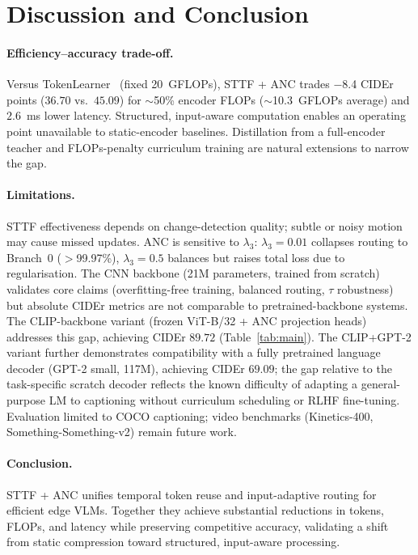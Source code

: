 \documentclass{article}
\begin{document}
\section{Discussion and Conclusion}

\paragraph{Efficiency--accuracy trade-off.}
Versus TokenLearner~\cite{ryoo2021tokenlearner} (fixed 20~GFLOPs), STTF + ANC trades $-$8.4 CIDEr points ($36.70$ vs.\ $45.09$) for $\sim$50\% encoder FLOPs ($\sim$10.3~GFLOPs average) and $2.6$~ms lower latency. Structured, input-aware computation enables an operating point unavailable to static-encoder baselines. Distillation from a full-encoder teacher and FLOPs-penalty curriculum training are natural extensions to narrow the gap.

\paragraph{Limitations.}
STTF effectiveness depends on change-detection quality; subtle or noisy motion may cause missed updates. ANC is sensitive to $\lambda_3$: $\lambda_3{=}0.01$ collapses routing to Branch~0 ($>$99.97\%), $\lambda_3{=}0.5$ balances but raises total loss due to regularisation. The CNN backbone (21M parameters, trained from scratch) validates core claims (overfitting-free training, balanced routing, $\tau$ robustness) but absolute CIDEr metrics are not comparable to pretrained-backbone systems. The CLIP-backbone variant (frozen ViT-B/32 + ANC projection heads) addresses this gap, achieving CIDEr $89.72$ (Table~\ref{tab:main}). The CLIP+GPT-2 variant further demonstrates compatibility with a fully pretrained language decoder (GPT-2 small, 117M), achieving CIDEr $69.09$; the gap relative to the task-specific scratch decoder reflects the known difficulty of adapting a general-purpose LM to captioning without curriculum scheduling or RLHF fine-tuning. Evaluation limited to COCO captioning; video benchmarks (Kinetics-400, Something-Something-v2) remain future work.

\paragraph{Conclusion.}
STTF + ANC unifies temporal token reuse and input-adaptive routing for efficient edge VLMs. Together they achieve substantial reductions in tokens, FLOPs, and latency while preserving competitive accuracy, validating a shift from static compression toward structured, input-aware processing.
\end{document}
